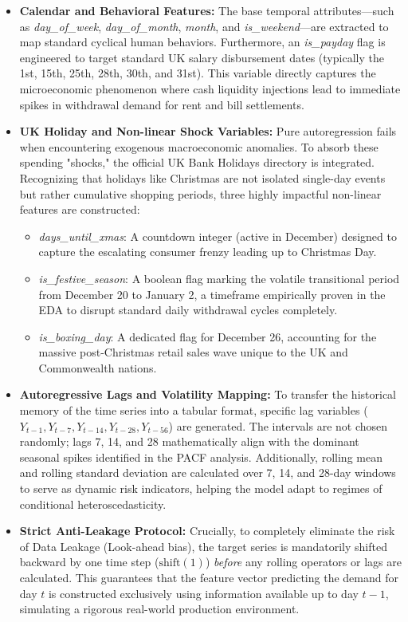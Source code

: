 \documentclass[conference, 12pt, onecolumn]{IEEEtran}
\begin{document}
\begin{itemize}
    \item \textbf{Calendar and Behavioral Features:} The base temporal attributes—such as \textit{day\_of\_week}, \textit{day\_of\_month}, \textit{month}, and \textit{is\_weekend}—are extracted to map standard cyclical human behaviors. Furthermore, an \textit{is\_payday} flag is engineered to target standard UK salary disbursement dates (typically the 1st, 15th, 25th, 28th, 30th, and 31st). This variable directly captures the microeconomic phenomenon where cash liquidity injections lead to immediate spikes in withdrawal demand for rent and bill settlements.

    \item \textbf{UK Holiday and Non-linear Shock Variables:} Pure autoregression fails when encountering exogenous macroeconomic anomalies. To absorb these spending "shocks," the official UK Bank Holidays directory is integrated. Recognizing that holidays like Christmas are not isolated single-day events but rather cumulative shopping periods, three highly impactful non-linear features are constructed:
    \begin{itemize}
        \item \textit{days\_until\_xmas}: A countdown integer (active in December) designed to capture the escalating consumer frenzy leading up to Christmas Day.
        \item \textit{is\_festive\_season}: A boolean flag marking the volatile transitional period from December 20 to January 2, a timeframe empirically proven in the EDA to disrupt standard daily withdrawal cycles completely.
        \item \textit{is\_boxing\_day}: A dedicated flag for December 26, accounting for the massive post-Christmas retail sales wave unique to the UK and Commonwealth nations.
    \end{itemize}

    \item \textbf{Autoregressive Lags and Volatility Mapping:} To transfer the historical memory of the time series into a tabular format, specific lag variables ($Y_{t-1}, Y_{t-7}, Y_{t-14}, Y_{t-28}, Y_{t-56}$) are generated. The intervals are not chosen randomly; lags 7, 14, and 28 mathematically align with the dominant seasonal spikes identified in the PACF analysis. Additionally, rolling mean and rolling standard deviation are calculated over 7, 14, and 28-day windows to serve as dynamic risk indicators, helping the model adapt to regimes of conditional heteroscedasticity. 
    \item \textbf{Strict Anti-Leakage Protocol:} Crucially, to completely eliminate the risk of Data Leakage (Look-ahead bias), the target series is mandatorily shifted backward by one time step ($\text{shift}(1)$) \textit{before} any rolling operators or lags are calculated. This guarantees that the feature vector predicting the demand for day $t$ is constructed exclusively using information available up to day $t-1$, simulating a rigorous real-world production environment.
\end{itemize}
\end{document}
